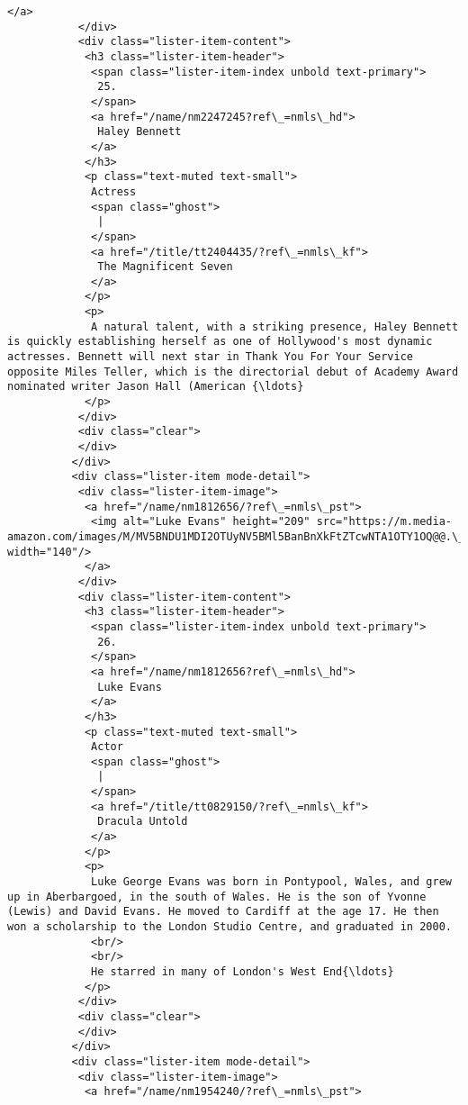 \documentclass[11pt]{article}
\begin{document}
\begin{Verbatim}[commandchars=\\\{\}]
            </a>
           </div>
           <div class="lister-item-content">
            <h3 class="lister-item-header">
             <span class="lister-item-index unbold text-primary">
              25.
             </span>
             <a href="/name/nm2247245?ref\_=nmls\_hd">
              Haley Bennett
             </a>
            </h3>
            <p class="text-muted text-small">
             Actress
             <span class="ghost">
              |
             </span>
             <a href="/title/tt2404435/?ref\_=nmls\_kf">
              The Magnificent Seven
             </a>
            </p>
            <p>
             A natural talent, with a striking presence, Haley Bennett is quickly establishing herself as one of Hollywood's most dynamic actresses. Bennett will next star in Thank You For Your Service opposite Miles Teller, which is the directorial debut of Academy Award nominated writer Jason Hall (American {\ldots}
            </p>
           </div>
           <div class="clear">
           </div>
          </div>
          <div class="lister-item mode-detail">
           <div class="lister-item-image">
            <a href="/name/nm1812656/?ref\_=nmls\_pst">
             <img alt="Luke Evans" height="209" src="https://m.media-amazon.com/images/M/MV5BNDU1MDI2OTUyNV5BMl5BanBnXkFtZTcwNTA1OTY1OQ@@.\_V1\_UY209\_CR8,0,140,209\_AL\_.jpg" width="140"/>
            </a>
           </div>
           <div class="lister-item-content">
            <h3 class="lister-item-header">
             <span class="lister-item-index unbold text-primary">
              26.
             </span>
             <a href="/name/nm1812656?ref\_=nmls\_hd">
              Luke Evans
             </a>
            </h3>
            <p class="text-muted text-small">
             Actor
             <span class="ghost">
              |
             </span>
             <a href="/title/tt0829150/?ref\_=nmls\_kf">
              Dracula Untold
             </a>
            </p>
            <p>
             Luke George Evans was born in Pontypool, Wales, and grew up in Aberbargoed, in the south of Wales. He is the son of Yvonne (Lewis) and David Evans. He moved to Cardiff at the age 17. He then won a scholarship to the London Studio Centre, and graduated in 2000.
             <br/>
             <br/>
             He starred in many of London's West End{\ldots}
            </p>
           </div>
           <div class="clear">
           </div>
          </div>
          <div class="lister-item mode-detail">
           <div class="lister-item-image">
            <a href="/name/nm1954240/?ref\_=nmls\_pst">

\end{Verbatim}
\end{document}
